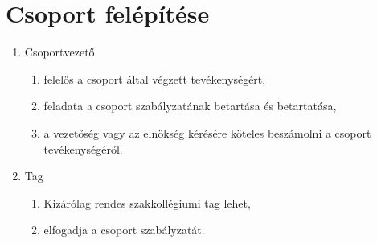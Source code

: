 \documentclass[12pt]{report}
\begin{document}
\section{Csoport felépítése}

\begin{enumerate}
  \item Csoportvezető
  \begin{enumerate}
    \item felelős a csoport által végzett tevékenységért,
    \item feladata a csoport szabályzatának betartása és betartatása,
    \item a vezetőség vagy az elnökség kérésére köteles beszámolni a csoport tevékenységéről.
  \end{enumerate}

  \item Tag
  \begin{enumerate}
    \item Kizárólag rendes szakkollégiumi tag lehet,
    \item elfogadja a csoport szabályzatát.
  \end{enumerate}
\end{enumerate}
\end{document}
